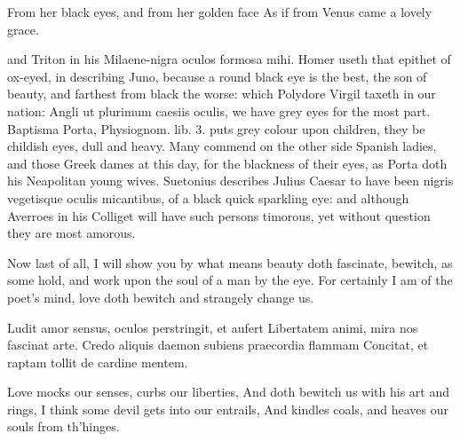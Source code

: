 {From her black eyes, and from her golden face
As if from Venus came a lovely grace.

and Triton in his Milaene-nigra oculos formosa mihi. Homer
useth that epithet of ox-eyed, in describing Juno, because a round
black eye is the best, the son of beauty, and farthest from black the
worse: which Polydore Virgil taxeth in our nation: Angli ut
plurimum caesiis oculis, we have grey eyes for the most part. Baptisma
Porta, Physiognom. lib. 3. puts grey colour upon children, they be
childish eyes, dull and heavy. Many commend on the other side Spanish
ladies, and those Greek dames at this day, for the blackness of
their eyes, as Porta doth his Neapolitan young wives. Suetonius
describes Julius Caesar to have been nigris vegetisque oculis
micantibus, of a black quick sparkling eye: and although Averroes in
his Colliget will have such persons timorous, yet without question they
are most amorous.

Now last of all, I will show you by what means beauty doth fascinate,
bewitch, as some hold, and work upon the soul of a man by the eye. For
certainly I am of the poet's mind, love doth bewitch and strangely
change us.

Ludit amor sensus, oculos perstringit, et aufert
Libertatem animi, mira nos fascinat arte.
Credo aliquis daemon subiens praecordia flammam
Concitat, et raptam tollit de cardine mentem.

Love mocks our senses, curbs our liberties,
And doth bewitch us with his art and rings,
I think some devil gets into our entrails,
And kindles coals, and heaves our souls from th'hinges.

}
